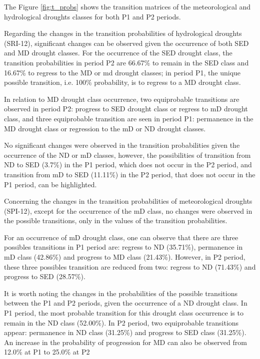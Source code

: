         The Figure \ref{fig:t_probs} shows the transition matrices of the meteorological and hydrological droughts classes for both P1 and P2 periods.
        
        Regarding the changes in the transition probabilities of hydrological droughts (SRI-12), significant changes can be observed given the occurrence of both SED and MD drought classes. For the occurrence of the SED drought class, the transition probabilities in period P2 are 66.67\% to remain in the SED class and 16.67\% to regress to the MD or md drought classes; in period P1, the unique possible transition, i.e. 100\% probability, is to regress to a MD drought class.

        In relation to MD drought class occurrence, two equiprobable transitions are observed in period P2: progress to SED drought class or regress to mD drought class, and three equiprobable transition are seen in period P1: permanence in the MD drought class or regression to the mD or ND drought classes.

        No significant changes were observed in the transition probabilities given the occurrence of the ND or mD classes, however, the possibilities of transition from ND to SED (3.7\%) in the P1 period, which does not occur in the P2 period, and transition from mD to SED (11.11\%) in the P2 period, that does not occur in the P1 period, can be highlighted.

        Concerning the changes in the transition probabilities of meteorological droughts (SPI-12), except for the occurrence of the mD class, no changes were observed in the possible transitions, only in the values of the transition probabilities. 
        
        For an occurrence of mD drought class, one can observe that there are three possibles transitions in P1 period are: regress to ND (35.71\%), permanence in mD class (42.86\%) and progress to MD class (21.43\%). However, in P2 period, these three possibles transition are reduced from two: regress to ND (71.43\%) and progress to SED (28.57\%).

        It is worth noting the changes in the probabilities of the possible transitions between the P1 and P2 periods, given the occurrence of a ND drought class. In P1 period, the most probable transition for this drought class occurrence is to remain in the ND class (52.00\%). In P2 period, two equiprobable transitions appear: permanence in ND class (31.25\%) and progress to SED class (31.25\%). An increase in the probability of progression for MD can also be observed from 12.0\% at P1 to 25.0\% at P2
        
